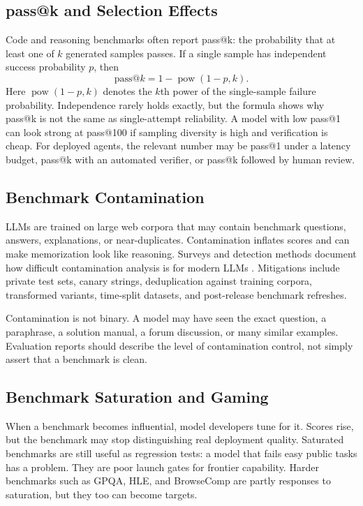 \subsection{pass@k and Selection Effects}
Code and reasoning benchmarks often report pass@k: the probability that at least one of $k$ generated samples passes. If a single sample has independent success probability $p$, then
\[
    \mathrm{pass@}k = 1-\operatorname{pow}(1-p,k).
\]
Here $\operatorname{pow}(1-p,k)$ denotes the $k$th power of the single-sample failure probability.
Independence rarely holds exactly, but the formula shows why pass@k is not the same as single-attempt reliability. A model with low pass@1 can look strong at pass@100 if sampling diversity is high and verification is cheap. For deployed agents, the relevant number may be pass@1 under a latency budget, pass@k with an automated verifier, or pass@k followed by human review.

\subsection{Benchmark Contamination}
LLMs are trained on large web corpora that may contain benchmark questions, answers, explanations, or near-duplicates. Contamination inflates scores and can make memorization look like reasoning. Surveys and detection methods document how difficult contamination analysis is for modern LLMs \cite{shi2023detecting,xu2024benchmark}. Mitigations include private test sets, canary strings, deduplication against training corpora, transformed variants, time-split datasets, and post-release benchmark refreshes.

Contamination is not binary. A model may have seen the exact question, a paraphrase, a solution manual, a forum discussion, or many similar examples. Evaluation reports should describe the level of contamination control, not simply assert that a benchmark is clean.

\subsection{Benchmark Saturation and Gaming}
When a benchmark becomes influential, model developers tune for it. Scores rise, but the benchmark may stop distinguishing real deployment quality. Saturated benchmarks are still useful as regression tests: a model that fails easy public tasks has a problem. They are poor launch gates for frontier capability. Harder benchmarks such as GPQA, HLE, and BrowseComp are partly responses to saturation, but they too can become targets.


